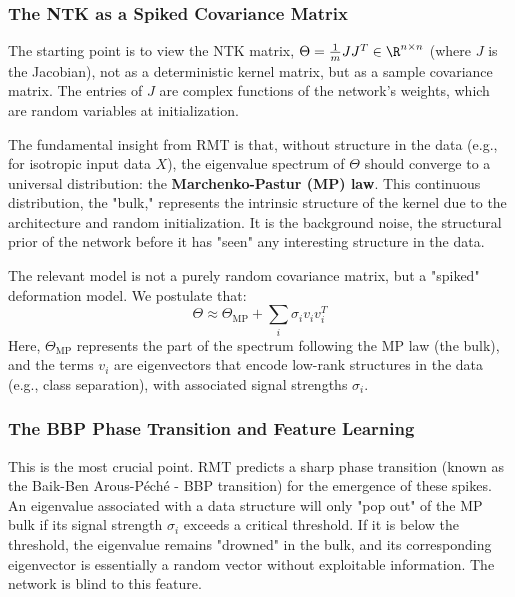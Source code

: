 \documentclass[a4paper]{article}
\begin{document}
\subsubsection{The NTK as a Spiked Covariance Matrix}
The starting point is to view the NTK matrix, $\Theta = \frac{1}{m}JJ^T \in \R^{n \times n}$ (where $J$ is the Jacobian), not as a deterministic kernel matrix, but as a sample covariance matrix. The entries of $J$ are complex functions of the network's weights, which are random variables at initialization.

The fundamental insight from RMT is that, without structure in the data (e.g., for isotropic input data $X$), the eigenvalue spectrum of $\Theta$ should converge to a universal distribution: the \textbf{Marchenko-Pastur (MP) law}. This continuous distribution, the "bulk," represents the intrinsic structure of the kernel due to the architecture and random initialization. It is the background noise, the structural prior of the network before it has "seen" any interesting structure in the data.

The relevant model is not a purely random covariance matrix, but a "spiked" deformation model. We postulate that:
\[
\Theta \approx \Theta_{\text{MP}} + \sum_{i} \sigma_i v_i v_i^T
\]
Here, $\Theta_{\text{MP}}$ represents the part of the spectrum following the MP law (the bulk), and the terms $v_i$ are eigenvectors that encode low-rank structures in the data (e.g., class separation), with associated signal strengths $\sigma_i$.

\subsubsection{The BBP Phase Transition and Feature Learning}
This is the most crucial point. RMT predicts a sharp phase transition (known as the Baik-Ben Arous-Péché - BBP transition) for the emergence of these spikes. An eigenvalue associated with a data structure will only "pop out" of the MP bulk if its signal strength $\sigma_i$ exceeds a critical threshold. If it is below the threshold, the eigenvalue remains "drowned" in the bulk, and its corresponding eigenvector is essentially a random vector without exploitable information. The network is blind to this feature.
\end{document}
